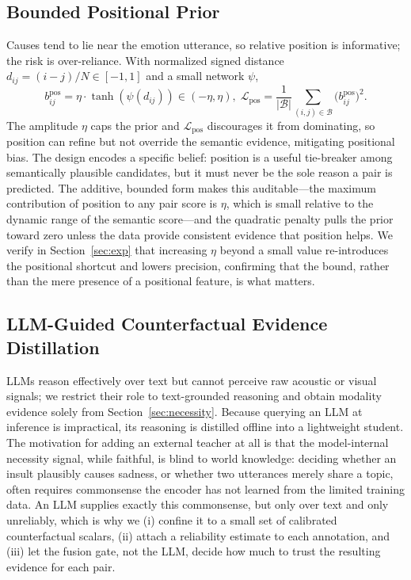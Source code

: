 \documentclass[journal]{IEEEtran}
\begin{document}
\subsection{Bounded Positional Prior}
\label{sec:pos}
Causes tend to lie near the emotion utterance, so relative position is informative; the risk
is over-reliance. With normalized signed distance $d_{ij}=(i-j)/N\in[-1,1]$ and a small
network $\psi$,
\begin{equation}
b_{ij}^{\mathrm{pos}}=\eta\cdot\tanh(\psi(d_{ij}))\in(-\eta,\eta),\;
\mathcal{L}_{\mathrm{pos}}=\frac{1}{|\mathcal{B}|}\sum_{(i,j)\in\mathcal{B}}\big(b_{ij}^{\mathrm{pos}}\big)^2 .
\end{equation}
The amplitude $\eta$ caps the prior and $\mathcal{L}_{\mathrm{pos}}$ discourages it from
dominating, so position can refine but not override the semantic evidence, mitigating
positional bias. The design encodes a specific belief: position is a useful tie-breaker among
semantically plausible candidates, but it must never be the sole reason a pair is predicted.
The additive, bounded form makes this auditable---the maximum contribution of position to any
pair score is $\eta$, which is small relative to the dynamic range of the semantic score---and
the quadratic penalty pulls the prior toward zero unless the data provide consistent evidence
that position helps. We verify in Section~\ref{sec:exp} that increasing $\eta$ beyond a small
value re-introduces the positional shortcut and lowers precision, confirming that the bound,
rather than the mere presence of a positional feature, is what matters.

\subsection{LLM-Guided Counterfactual Evidence Distillation}
\label{sec:llm}
LLMs reason effectively over text but cannot perceive raw acoustic or visual signals; we
restrict their role to text-grounded reasoning and obtain modality evidence solely from
Section~\ref{sec:necessity}. Because querying an LLM at inference is impractical, its
reasoning is distilled offline into a lightweight student. The motivation for adding an
external teacher at all is that the model-internal necessity signal, while faithful, is blind
to world knowledge: deciding whether an insult plausibly causes sadness, or whether two
utterances merely share a topic, often requires commonsense the encoder has not learned from
the limited training data. An LLM supplies exactly this commonsense, but only over text and
only unreliably, which is why we (i) confine it to a small set of calibrated counterfactual
scalars, (ii) attach a reliability estimate to each annotation, and (iii) let the fusion gate,
not the LLM, decide how much to trust the resulting evidence for each pair.
\end{document}
